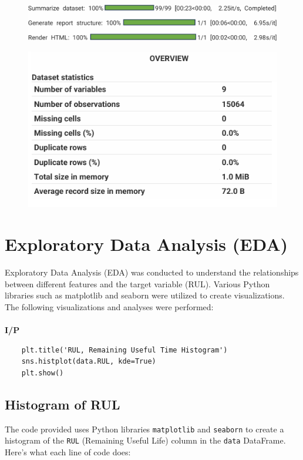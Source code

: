\begin{figure}[h!]
    \centering
    \includegraphics[width=\textwidth]{grapph.png}
\end{figure}
\begin{figure}[h!]
    \centering
    \includegraphics[width=1\textwidth]{overview.png} 
    \label{fig:another}
\end{figure}

\section{Exploratory Data Analysis (EDA)}
Exploratory Data Analysis (EDA) was conducted to understand the relationships between different features and the target variable (RUL). Various Python libraries such as matplotlib and seaborn were utilized to create visualizations. The following visualizations and analyses were performed:\\
\\
\noindent
\textbf{I/P} \\[-2.5em] %
\begin{verbatim}
    plt.title('RUL, Remaining Useful Time Histogram') 
    sns.histplot(data.RUL, kde=True) 
    plt.show()   
\end{verbatim}

\subsection{Histogram of RUL}
The code provided uses Python libraries \texttt{matplotlib} and \texttt{seaborn} to create a histogram of the \texttt{RUL} (Remaining Useful Life) column in the \texttt{data} DataFrame. Here’s what each line of code does:


